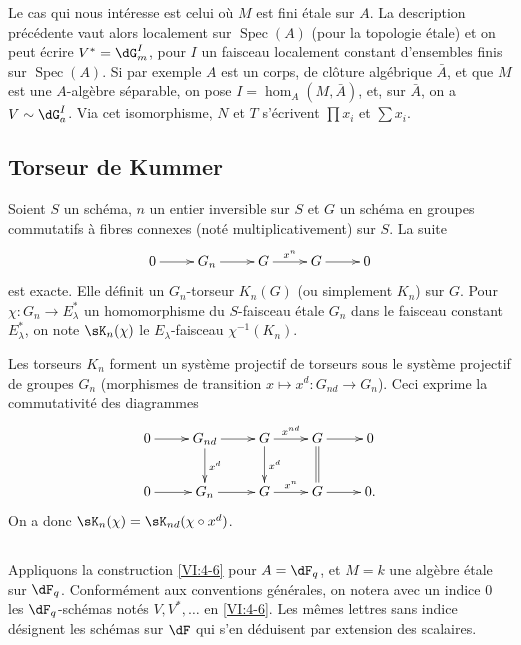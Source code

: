 \documentclass[oneside]{book}
\DeclareMathOperator{\spec}{Spec}
\theoremstyle{sga-source}
\theoremstyle{sga-source-dash}
\theoremstyle{sga-source-dotdash}
\theoremstyle{sga-source-number-note-dash}
\theoremstyle{sga-source-note-number-dotdash}
\theoremstyle{sga-source-example-dotdash}
\theoremstyle{sga-source-inline-number}
\theoremstyle{sga-source-bare-number}
\theoremstyle{sga-source}
\newcommand{\PrintPage}[1]{}\newcommand{\MathPage}[1]{}\newcommand{\PrintCite}[2]{#1}\newcommand{\var}[3]{#2}
\begin{document}
\PrintPage{199}
Le cas qui nous intéresse est celui où $M$ est fini étale sur $A$. La 
description précédente vaut alors localement sur $\spec(A)$ (pour la 
topologie étale) et on peut écrire $V^\ast=\dG_m^I$, pour $I$ un faisceau 
localement constant d'ensembles finis sur $\spec(A)$. Si par exemple $A$ est un 
corps, de clôture algébrique $\bar A$, et que $M$ est une $A$-algèbre 
séparable, on pose $I=\hom_A(M,\bar A)$, et, sur $\bar A$, on a 
$V\sim \dG_a^I$. Via cet isomorphisme, $N$ et $T$ s'écrivent $\prod x_i$ et 
$\sum x_i$. 





\subsection{Torseur de Kummer}\label{VI:4-7}

Soient $S$ un schéma, $n$ un entier inversible sur $S$ et $G$ un schéma en 
groupes commutatifs à fibres connexes (noté multiplicativement) sur $S$. 
La suite 
\[\xymatrix{
  0 \ar[r] 
    & G_n \ar[r] 
    & G \ar[r]^-{x^n} 
    & G \ar[r] 
    & 0 
}\]
est exacte. Elle définit un $G_n$-torseur $K_n(G)$ (ou simplement $K_n$) sur 
$G$. Pour $\chi:G_n \to E_\lambda^\ast$ un homomorphisme du $S$-faisceau 
étale $G_n$ dans le faisceau constant $E_\lambda^\ast$, on note 
$\sK_n(\chi)$ le $E_\lambda$-faisceau $\chi^{-1}(K_n)$. 

Les torseurs $K_n$ forment un système projectif de torseurs sous le 
système projectif de groupes $G_n$ (morphismes de transition 
$x\mapsto x^d:G_{n d}\to G_n$). Ceci exprime la commutativité des diagrammes 
\[\xymatrix{
  0 \ar[r] 
    & G_{n d} \ar[r] \ar[d]^-{x^d} 
    & G \ar[r]^-{x^{n d}} \ar[d]^-{x^d} 
    & G \ar[r] \ar@{=}[d] 
    & 0 \\
  0 \ar[r] 
    & G_n \ar[r] 
    & G \ar[r]^-{x^n} 
    & G \ar[r] 
    & 0 \text{.} 
}\]
On a donc $\sK_n(\chi) = \sK_{n d}(\chi\circ x^d)$. 





\subsection{}\label{VI:4-8}

Appliquons la construction \ref{VI:4-6} pour $A=\dF_q$, et $M=k$ une algèbre 
étale sur $\dF_q$. Conformément aux conventions générales, on notera 
avec un indice $0$ les $\dF_q$-schémas notés $V,V^\ast,\ldots$ en 
\ref{VI:4-6}. Les mêmes lettres sans indice désignent les schémas sur 
$\dF$ qui s'en déduisent par extension des scalaires. 
\end{document}
